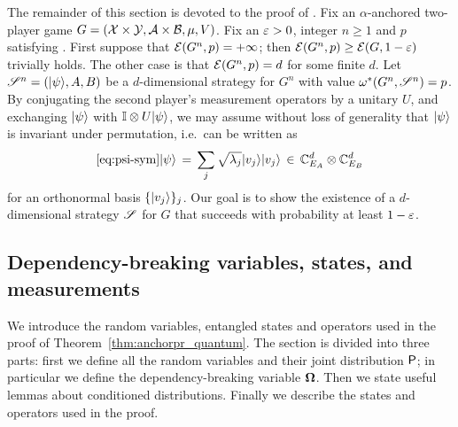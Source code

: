 
The remainder of this section is devoted to the proof of . Fix an $\alpha$-anchored two-player game $G = (\X \times \Y,\A \times \B,\mu,V)$. Fix an $\eps > 0$, integer $n\geq 1$ and $p$ satisfying . First suppose that $\E(G^n,p) = +\infty$; then $\E(G^n,p) \geq \E(G,1 - \eps)$ trivially holds. The other case is that $\E(G^n,p) = d$ for some finite $d$. Let $\strategy^n = (\ket{\psi},A,B)$ be a $d$-dimensional strategy for $G^n$ with value $\eval(G^n,\strategy^n) = p$. By conjugating the second player's measurement operators by a unitary $U$, and exchanging $\ket{\psi}$ with $\Id \otimes U \ket{\psi}$, we may assume without loss of generality that $\ket{\psi}$ is  invariant under permutation, i.e.\ can be written as 
\begin{equation}\eqref{eq:psi-sym}
 \ket{\psi} \,=\, \sum_j \sqrt{\lambda_j} \ket{v_j} \ket{v_j}\,\in \, \C_{E_A}^d \otimes \C_{E_B}^d
\end{equation}
for an orthonormal basis $\{ \ket{v_j} \}_j$. Our goal is to show the existence of a $d$-dimensional strategy $\strategy$ for $G$ that succeeds with probability at least $1 - \eps$. 





\subsection{Dependency-breaking variables, states, and measurements}
\label{sec:quantum_setup}

We introduce the random variables, entangled states and operators used in the proof of Theorem~\ref{thm:anchorpr_quantum}. The section is divided into three parts: first we define all the random variables and their joint distribution $\P$; in particular we define the dependency-breaking variable $\bOmega$. Then we state useful lemmas about conditioned distributions. Finally we describe the states and operators used in the proof.

